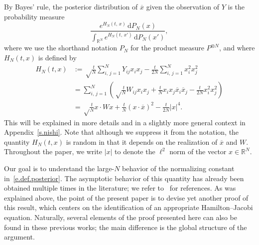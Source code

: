 \documentclass[10pt]{amsart}
\theoremstyle{definition}\newtheorem{defi}[theo]{Definition}\newtheorem{rema}[theo]{Remark}\newtheorem{exam}[theo]{Example}\newtheorem{exem}[theo]{Example}\newtheorem{nota}[theo]{Notation}
\newcommand{\R}{\mathbb{R}}
\renewcommand{\d}{\mathrm{d}}
\newcommand{\1}{\mathds{1}}
\renewcommand{\bar}{\overline}
\begin{document}
By Bayes' rule, the posterior distribution of $\bar x$ given the observation of $Y$ is the probability measure
\begin{equation}\label{e.def.posterior}
\frac { e^{H_N(t,\,x)} \, \d P_N(x)}{\int_{\R^N}e^{H_N(t,\,x')} \, \d P_N(x')},
\end{equation}
where we use the shorthand notation $P_N$ for the product measure $P^{\otimes N}$, and where $H_N(t,x)$ is defined by
\begin{equation}\label{e.def.H1}
\begin{aligned}
H_N(t,x) & :=
\sqrt \frac t N \sum_{i,\,j = 1}^N Y_{ij} x_i x_j - \frac t {2N}\sum_{i,\,j =1}^N x_i^2 x_j^2
\\
& = \sum_{i,\,j = 1}^N \left(\sqrt \frac t N W_{ij} x_i x_j + \frac t N x_i x_j \bar x_i \bar x_j- \frac t {2N} x_i^2 x_j^2 \right)
\\
& = \sqrt \frac t N x \cdot W x + \frac t N (x \cdot \bar x)^2 - \frac t {2N} |x|^4.
\end{aligned}
\end{equation}
This will be explained in more details and in a slightly more general context in Appendix~\ref{s.nishi}. Note that although we suppress it from the notation, the quantity $H_N(t,x)$ is random in that it depends on the realization of $\bar x$ and $W$. Throughout the paper, we write $|x|$ to denote the $\ell^2$ norm of the vector $x \in \R^N$.


Our goal is to understand the large-$N$ behavior of the normalizing constant in~\eqref{e.def.posterior}. The asymptotic behavior of this quantity has already been obtained multiple times in the literature; we refer to~\cite{bar1,bmm,bm1,dm,eak,lkz,lm} for references. As was explained above, the point of the present paper is to devise yet another proof of this result, which centers on the identification of an appropriate Hamilton--Jacobi equation. Naturally, several elements of the proof presented here can also be found in these previous works; the main difference is the global structure of the argument.


\end{document}
